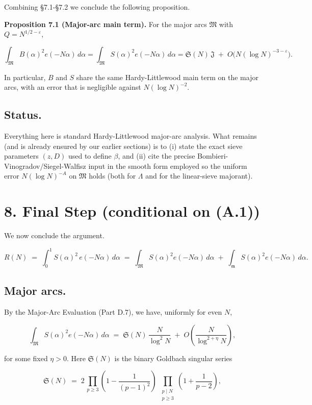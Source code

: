\documentclass[11pt]{article}
\theoremstyle{definition}
\theoremstyle{remark}
\begin{document}
Combining §7.1-§7.2 we conclude the following proposition.

\noindent\textbf{Proposition 7.1 (Major-arc main term).} For the major arcs $\mathfrak M$ with $Q=N^{1/2-\varepsilon}$,

$$
	\int_{\mathfrak M} B(\alpha)^2 e(-N\alpha)\,d\alpha
	=\int_{\mathfrak M} S(\alpha)^2 e(-N\alpha)\,d\alpha
	=\mathfrak S(N)\,\mathfrak J\;+\;O\!\big(N(\log N)^{-3-\varepsilon}\big).
$$

In particular, $B$ and $S$ share the same Hardy-Littlewood main term on the major arcs, with an error that is negligible against $N(\log N)^{-2}$.

\subsection*{Status.}
Everything here is standard Hardy-Littlewood major-arc analysis. What remains (and is already ensured by our earlier sections) is to (i) state the exact sieve parameters $(z,D)$ used to define $\beta$, and (ii) cite the precise Bombieri-Vinogradov/Siegel-Walfisz input in the smooth form employed so the uniform error $N(\log N)^{-A}$ on $\mathfrak M$ holds (both for $\Lambda$ and for the linear-sieve majorant).
\section*{8. Final Step (conditional on (A.1))}

We now conclude the argument.

$$
	R(N)\;=\;\int_0^1 S(\alpha)^2\,e(-N\alpha)\,d\alpha
	\;=\;\int_{\mathfrak M} S(\alpha)^2 e(-N\alpha)\,d\alpha
	\;+\;\int_{\mathfrak m} S(\alpha)^2 e(-N\alpha)\,d\alpha.
$$

\subsection*{Major arcs.}

By the Major-Arc Evaluation (Part D.7), we have, uniformly for even $N$,

$$
	\int_{\mathfrak M} S(\alpha)^2 e(-N\alpha)\,d\alpha
	\;=\;\mathfrak S(N)\,\frac{N}{\log^2 N}\;+\;O\!\left(\frac{N}{\log^{2+\eta}N}\right),
$$

for some fixed $\eta>0$. Here $\mathfrak S(N)$ is the binary Goldbach singular series

$$
	\mathfrak S(N)
	\;=\;2\,\prod_{p\ge 3}\!\left(1-\frac{1}{(p-1)^2}\right)
	\;\prod_{\substack{p\mid N\\ p\ge 3}}\!\!\left(1+\frac{1}{p-2}\right),
$$
\end{document}
